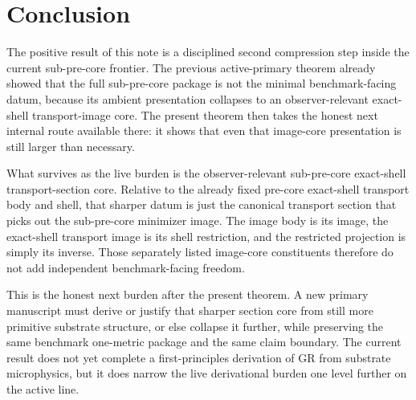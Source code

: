 \documentclass[11pt]{article}
\begin{document}
\section{Conclusion}

The positive result of this note is a disciplined second compression step inside the current sub-pre-core frontier. The previous active-primary theorem already showed that the full sub-pre-core package is not the minimal benchmark-facing datum, because its ambient presentation collapses to an observer-relevant exact-shell transport-image core. The present theorem then takes the honest next internal route available there: it shows that even that image-core presentation is still larger than necessary.

What survives as the live burden is the observer-relevant sub-pre-core exact-shell transport-section core. Relative to the already fixed pre-core exact-shell transport body and shell, that sharper datum is just the canonical transport section that picks out the sub-pre-core minimizer image. The image body is its image, the exact-shell transport image is its shell restriction, and the restricted projection is simply its inverse. Those separately listed image-core constituents therefore do not add independent benchmark-facing freedom.

This is the honest next burden after the present theorem. A new primary manuscript must derive or justify that sharper section core from still more primitive substrate structure, or else collapse it further, while preserving the same benchmark one-metric package and the same claim boundary. The current result does not yet complete a first-principles derivation of GR from substrate microphysics, but it does narrow the live derivational burden one level further on the active line.
\end{document}
